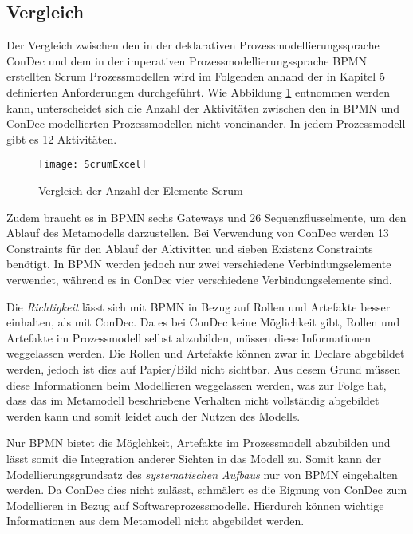 \subsection{Vergleich}

Der Vergleich zwischen den in der deklarativen Prozessmodellierungssprache ConDec und dem in der imperativen Prozessmodellierungssprache BPMN erstellten Scrum Prozessmodellen wird im Folgenden anhand der in Kapitel 5 definierten Anforderungen durchgeführt. \newline
Wie Abbildung \ref{fig:ScrumExcel} entnommen werden kann, unterscheidet sich die Anzahl der Aktivitäten zwischen den in BPMN und ConDec modellierten Prozessmodellen nicht voneinander. In jedem Prozessmodell gibt es 12 Aktivitäten.\newline

\begin{figure}[htp]
\begin{center}
  \texttt{[image: ScrumExcel]} %
  \caption{Vergleich der Anzahl der Elemente Scrum}
  \label{fig:ScrumExcel}
\end{center}
\end{figure}


Zudem braucht es in BPMN sechs Gateways und 26 Sequenzflusselmente, um den Ablauf des Metamodells darzustellen. Bei Verwendung von ConDec werden 13 Constraints für den Ablauf der Aktivitten und sieben Existenz Constraints benötigt. In BPMN werden jedoch nur zwei verschiedene Verbindungselemente verwendet, während es in ConDec vier verschiedene Verbindungselemente sind.\newline

Die \textit{Richtigkeit} lässt sich mit BPMN in Bezug auf Rollen und Artefakte besser einhalten, als mit ConDec. Da es bei ConDec keine Möglichkeit gibt, Rollen und Artefakte im Prozessmodell selbst abzubilden, müssen diese Informationen weggelassen werden. Die Rollen und Artefakte können zwar in Declare abgebildet werden, jedoch ist dies auf Papier/Bild nicht sichtbar. Aus desem Grund müssen diese Informationen beim Modellieren weggelassen werden, was zur Folge hat, dass das im Metamodell beschriebene Verhalten nicht vollständig abgebildet werden kann und somit leidet auch der Nutzen des Modells.\newline

Nur BPMN bietet die Möglchkeit, Artefakte im Prozessmodell abzubilden und lässt somit die Integration anderer Sichten in das Modell zu. Somit kann der Modellierungsgrundsatz des \textit{systematischen Aufbaus} nur von BPMN eingehalten werden. Da ConDec dies nicht zulässt, schmälert es die Eignung von ConDec zum Modellieren in Bezug auf Softwareprozessmodelle. Hierdurch können wichtige Informationen aus dem Metamodell nicht abgebildet werden. \newline 

